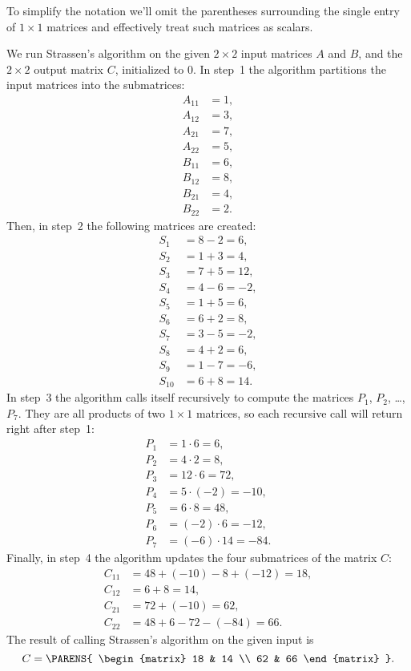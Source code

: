 To simplify the notation we'll omit the parentheses surrounding the single entry of $1\times1$ matrices and effectively treat such matrices as scalars.

We run Strassen's algorithm on the given $2\times2$ input matrices $A$ and $B$, and the $2\times2$ output matrix $C$, initialized to 0.
In step~1 the algorithm partitions the input matrices into the submatrices:
\begin{align*}
    A_{11} &= 1, \\
    A_{12} &= 3, \\
    A_{21} &= 7, \\
    A_{22} &= 5, \\
    B_{11} &= 6, \\
    B_{12} &= 8, \\
    B_{21} &= 4, \\
    B_{22} &= 2.
\end{align*}
Then, in step~2 the following matrices are created:
\begin{align*}
    S_{1\phantom{0}} &= 8-2 = 6, \\
    S_{2\phantom{0}} &= 1+3 = 4, \\
    S_{3\phantom{0}} &= 7+5 = 12, \\
    S_{4\phantom{0}} &= 4-6 = -2, \\
    S_{5\phantom{0}} &= 1+5 = 6, \\
    S_{6\phantom{0}} &= 6+2 = 8, \\
    S_{7\phantom{0}} &= 3-5 = -2, \\
    S_{8\phantom{0}} &= 4+2 = 6, \\
    S_{9\phantom{0}} &= 1-7 = -6, \\
    S_{10} &= 6+8 = 14.
\end{align*}
In step~3 the algorithm calls itself recursively to compute the matrices $P_1$, $P_2$, \dots, $P_7$.
They are all products of two $1\times1$ matrices, so each recursive call will return right after step~1:
\begin{align*}
    P_1 &= 1\cdot6 = 6, \\
    P_2 &= 4\cdot2 = 8, \\
    P_3 &= 12\cdot6 = 72, \\
    P_4 &= 5\cdot(-2) = -10, \\
    P_5 &= 6\cdot8 = 48, \\
    P_6 &= (-2)\cdot6 = -12, \\
    P_7 &= (-6)\cdot14 = -84.
\end{align*}
Finally, in step~4 the algorithm updates the four submatrices of the matrix $C$:
\begin{align*}
    C_{11} &= 48+(-10)-8+(-12) = 18, \\
    C_{12} &= 6+8 = 14, \\
    C_{21} &= 72+(-10) = 62, \\
    C_{22} &= 48+6-72-(-84) = 66.
\end{align*}
The result of calling Strassen's algorithm on the given input is
\[
    C = \PARENS{
        \begin{matrix}
            18 & 14 \\
            62 & 66
        \end{matrix}
    }.
\]
